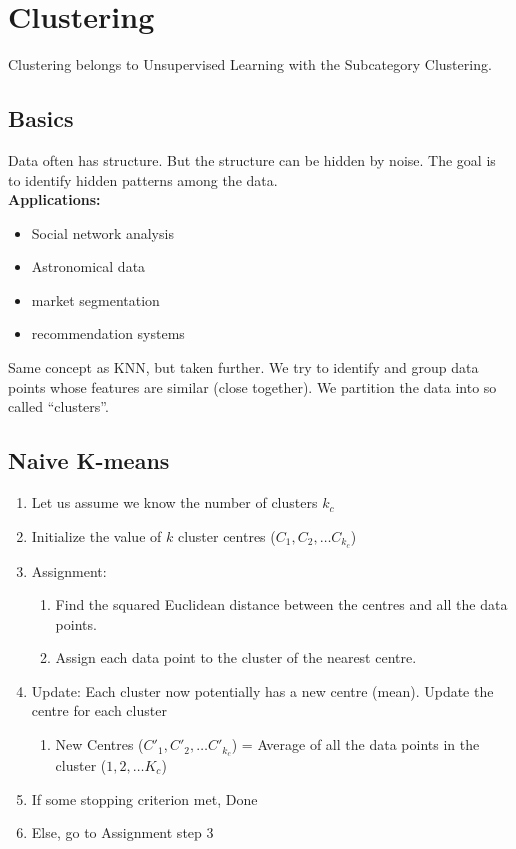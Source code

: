 \section{Clustering}
Clustering belongs to Unsupervised Learning with the Subcategory Clustering.

\subsection{Basics}
Data often has structure. 
But the structure can be hidden by noise.
The goal is to identify hidden patterns among the data.\\
\textbf{Applications:}
\begin{itemize}
  \item Social network analysis
  \item Astronomical data
  \item market segmentation
  \item recommendation systems
\end{itemize}
Same concept as KNN, but taken further.
We try to identify and group data points whose features are similar (close together).
We partition the data into so called ``clusters''.

\subsection{Naive K-means}
\begin{enumerate}
  \item Let us assume we know the number of clusters $k_c$
  \item Initialize the value of $k$ cluster centres ($C_1,C_2,\dots C_{k_c}$)
  \item Assignment:
  \begin{enumerate}
    \item Find the squared Euclidean distance between the centres and all the data points.
    \item Assign each data point to the cluster of the nearest centre.
  \end{enumerate}
  \item Update: Each cluster now potentially has a new centre (mean). Update the centre for each cluster
  \begin{enumerate}
    \item New Centres ($C'_1,C'_2,\dots C'_{k_c}$) = Average of all the data points in the cluster ($1,2, \dots K_c$)
  \end{enumerate}
  \item If some stopping criterion met, Done
  \item Else, go to Assignment step 3
\end{enumerate}


